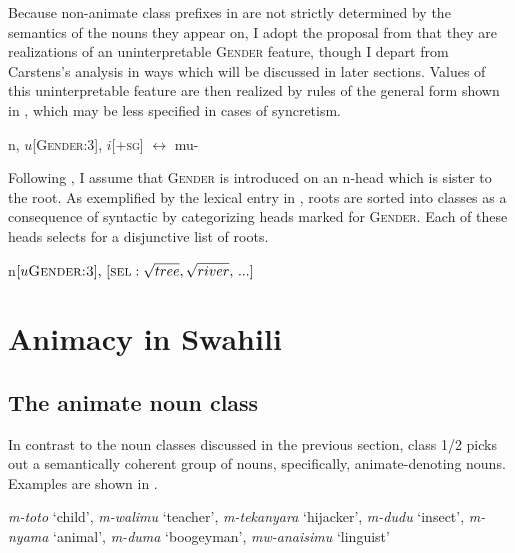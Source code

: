 \documentclass[output=paper
,newtxmath
,modfonts
,nonflat]{langsci/langscibook}
\begin{document}
Because non-animate class prefixes in  are not strictly determined by the semantics of the nouns they appear on, I adopt the proposal from \citet{carstens91, carstens08} that they are realizations of an uninterpretable \textsc{Gender} feature, though I depart from Carstens's analysis in ways which will be discussed in later sections. Values of this uninterpretable feature are then realized by rules of the general form shown in , which may be less specified in cases of syncretism. 

\ea\label{ex:pesetsky:moogender} \ea\label{ex:pesetsky:mooa}{ n, $u$[\textsc{Gender:3}], $i$[\textsc{+sg}] $\longleftrightarrow$ mu-}
 \label{ex:pesetsky:oceanij}
 \z \z

Following \citet{kramer15}, I assume that \textsc{Gender} is introduced on an n-head which is sister to the root. As exemplified by the lexical entry in , roots are sorted into classes as a consequence of syntactic  by categorizing heads marked for \textsc{Gender}. Each of these heads selects for a disjunctive list of roots.

\ea\label{ex:pesetsky:rootsorting}{n$[u\textsc{Gender:3}],\,[\textsc{sel}:\sqrt{tree}, \sqrt{river}, \, ...]$}   \z 


 \section{Animacy in Swahili} \label{sec:pesetsky:animacyinswahili}

\subsection{The animate noun class} \label{sec:pesetsky:animatesubsection}

In contrast to the noun classes discussed in the previous section, class 1/2 picks out a semantically coherent group of nouns, specifically, animate-denoting nouns. Examples are shown in .

\ea\label{ex:pesetsky:livingstuff}{ \textit{m-toto} `child', \textit{m-walimu} `teacher', \textit{m-tekanyara} `hijacker', \textit{m-dudu} `insect', \textit{m-nyama} `animal', \textit{m-duma} `boogeyman', \textit{mw-anaisimu} `linguist'} \z
\end{document}
